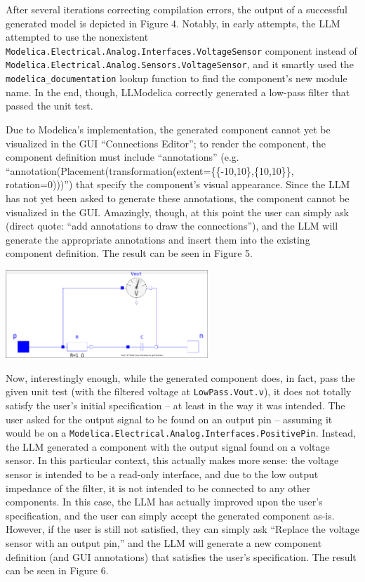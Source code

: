 \documentclass[11pt]{article}
\begin{document}
After several iterations correcting compilation errors, the output of a successful generated model is depicted in Figure 4. Notably, in early attempts, the LLM attempted to use the nonexistent \texttt{Modelica.Electrical.Analog.Interfaces.VoltageSensor} component instead of\\[0pt]
\texttt{Modelica.Electrical.Analog.Sensors.VoltageSensor}, and it smartly used the \texttt{modelica\_documentation} lookup function to find the component's new module name. In the end, though, LLModelica correctly generated a low-pass filter that passed the unit test.

Due to Modelica's implementation, the generated component cannot yet be visualized in the GUI ``Connections Editor''; to render the component, the component definition must include ``annotations'' (e.g. ``annotation(Placement(transformation(extent=\{\{-10,10\},\{10,10\}\}, rotation=0)))'') that specify the component's visual appearance. Since the LLM has not yet been asked to generate these annotations, the component cannot be visualized in the GUI. Amazingly, though, at this point the user can simply ask (direct quote: ``add annotations to draw the connections''), and the LLM will generate the appropriate annotations and insert them into the existing component definition. The result can be seen in Figure 5.

\begin{center}
\includegraphics[width=3in]{./images/passive_lowpass_generated_v1.png}
\end{center}

Now, interestingly enough, while the generated component does, in fact, pass the given unit test (with the filtered voltage at \texttt{LowPass.Vout.v}), it does not totally satisfy the user's initial specification -- at least in the way it was intended. The user asked for the output signal to be found on an output pin -- assuming it would be on a \texttt{Modelica.Electrical.Analog.Interfaces.PositivePin}. Instead, the LLM generated a component with the output signal found on a voltage sensor. In this particular context, this actually makes more sense: the voltage sensor is intended to be a read-only interface, and due to the low output impedance of the filter, it is not intended to be connected to any other components. In this case, the LLM has actually improved upon the user's specification, and the user can simply accept the generated component as-is. However, if the user is still not satisfied, they can simply ask ``Replace the voltage sensor with an output pin,''  and the LLM will generate a new component definition (and GUI annotations) that satisfies the user's specification. The result can be seen in Figure 6.
\end{document}
